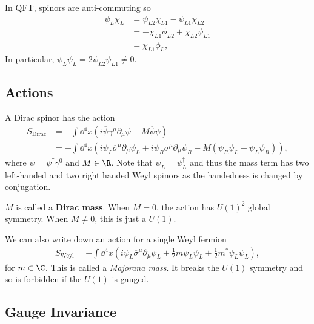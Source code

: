 \begin{note}
    In QFT, spinors are anti-commuting so
    \begin{align}
        \psi_L \chi_L &= \psi_{L 2} \chi_{L 1} - \psi_{L 1} \chi_{L 2} \\
        &= - \chi_{L 1} \phi_{L 2} + \chi_{ L 2} \psi_{L 1}  \\
        &= \chi_{L 1} \phi_{L} 
    ,\end{align}
    In particular, $\psi_{L} \psi_{L} = 2 \psi_{L 2} \psi_{L 1} \neq 0 $.
\end{note}


\subsection{Actions}

A Dirac spinor has the action
\begin{align}
    S_\text{Dirac} &= - \int \dd{^{4}x} \left( i \overline{\psi} \gamma^{\mu} \partial_\mu \psi - M \overline{\psi} \psi \right)  \\
    &= - \int \dd{^{4}x} \left( i \overline{\psi}_L \overline{\sigma}^{\mu} \partial_\mu \psi_L + i \overline{\psi}_R \sigma^{\mu} \partial_\mu \psi_R - M \left( \overline{\psi}_R \psi_L + \overline{\psi}_L \psi_R \right)  \right) 
,\end{align}
where $\overline{\psi} = \psi^{\dag} \gamma^{0}$ and $M \in \R$. Note that $\overline{\psi}_L = \psi^{\dag}_L$ and thus the mass term has two left-handed and two right handed Weyl spinors as the handedness is changed by conjugation.

\begin{note}
    $M$ is called a \textbf{Dirac mass}. When $M = 0$, the action has $U \left( 1 \right)^2$ global symmetry. When $M \neq 0$, this is just a $U\left( 1 \right)$.
\end{note}

We can also write down an action for a single Weyl fermion
\begin{align}
    S_\text{Weyl} = - \int \dd{^{4}x} \left( i \overline{\psi}_L \overline{\sigma}^{\mu} \partial_\mu \psi_L + \frac{1}{2} m \psi_L \psi_L + \frac{1}{2} m^{*} \overline{\psi}_L \overline{\psi}_L \right) 
,\end{align}
for $m \in \C$. This is called a \textit{Majorana mass}. It breaks the $U \left( 1 \right) $ symmetry and so is forbidden if the $U\left( 1 \right) $ is gauged.

\subsection{Gauge Invariance}

